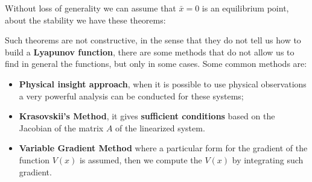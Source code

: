 Without loss of generality we can assume that $\bar{x}=0$ is an equilibrium point, about the stability we have these theorems: \\


\hspace*{-5mm}
\vspace{0.5cm}

\hspace*{-5mm}
%


\noindent
Such theorems are not constructive,  in the sense that they do not tell us how to build a \textbf{Lyapunov function}, there are some methods that do not allow us to find in general the functions, but only in some cases. Some common methods are:
\begin{itemize}
    \item \textbf{Physical insight approach}, when it is possible to use physical observations a very powerful analysis can be conducted for these systems; 
    \item \textbf{Krasovskii's Method}, it gives \textbf{sufficient conditions} based on the Jacobian of the matrix $A$ of the linearized system. 
    \item \textbf{Variable Gradient Method} where a particular form for the gradient of the function $V(x)$ is assumed, then we compute the $V(x)$ by integrating such gradient.
\end{itemize}

